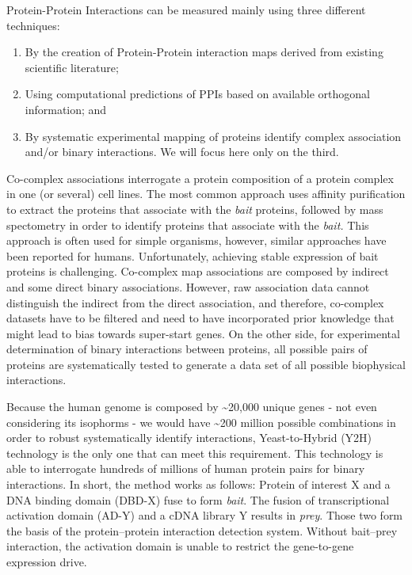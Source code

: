 \documentclass[
]{book}
\begin{document}
Protein-Protein Interactions can be measured mainly using three different techniques:

\begin{enumerate}
\def\labelenumi{\arabic{enumi}.}
\item
  By the creation of Protein-Protein interaction maps derived from existing scientific literature;
\item
  Using computational predictions of PPIs based on available orthogonal information; and
\item
  By systematic experimental mapping of proteins identify complex association and/or binary interactions. We will focus here only on the third.
\end{enumerate}

Co-complex associations interrogate a protein composition of a protein complex in one (or several) cell lines. The most common approach uses affinity purification to extract the proteins that associate with the \emph{bait} proteins, followed by mass spectometry in order to identify proteins that associate with the \emph{bait.} This approach is often used for simple organisms, however, similar approaches have been reported for humans. Unfortunately, achieving stable expression of bait proteins is challenging. Co-complex map associations are composed by indirect and some direct binary associations. However, raw association data cannot distinguish the indirect from the direct association, and therefore, co-complex datasets have to be filtered and need to have incorporated prior knowledge that might lead to bias towards super-start genes. On the other side, for experimental determination of binary interactions between proteins, all possible pairs of proteins are systematically tested to generate a data set of all possible biophysical interactions.

Because the human genome is composed by \textasciitilde20,000 unique genes - not even considering its isophorms - we would have \textasciitilde200 million possible combinations in order to robust systematically identify interactions, Yeast-to-Hybrid (Y2H) technology is the only one that can meet this requirement. This technology is able to interrogate hundreds of millions of human protein pairs for binary interactions. In short, the method works as follows: Protein of interest X and a DNA binding domain (DBD-X) fuse to form \emph{bait}. The fusion of transcriptional activation domain (AD-Y) and a cDNA library Y results in \emph{prey}. Those two form the basis of the protein--protein interaction detection system. Without bait--prey interaction, the activation domain is unable to restrict the gene-to-gene expression drive.
\end{document}
